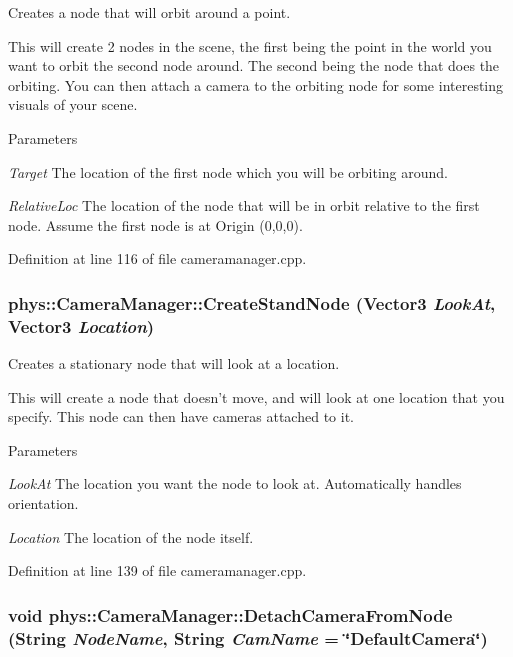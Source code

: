 Creates a node that will orbit around a point. 

This will create 2 nodes in the scene, the first being the point in the world you want to orbit the second node around. The second being the node that does the orbiting. You can then attach a camera to the orbiting node for some interesting visuals of your scene. 
\begin{DoxyParams}{Parameters}
\item[{\em Target}]The location of the first node which you will be orbiting around. \item[{\em RelativeLoc}]The location of the node that will be in orbit relative to the first node. Assume the first node is at Origin (0,0,0). \end{DoxyParams}


Definition at line 116 of file cameramanager.cpp.

\hypertarget{classphys_1_1CameraManager_ab5f9ca6b053670e69f5812cf573d5972}{
\subsubsection[{CreateStandNode}]{ phys::CameraManager::CreateStandNode ({\bf Vector3} {\em LookAt}, \/  {\bf Vector3} {\em Location})}}
\label{d9/d91/classphys_1_1CameraManager_ab5f9ca6b053670e69f5812cf573d5972}


Creates a stationary node that will look at a location. 

This will create a node that doesn't move, and will look at one location that you specify. This node can then have cameras attached to it. 
\begin{DoxyParams}{Parameters}
\item[{\em LookAt}]The location you want the node to look at. Automatically handles orientation. \item[{\em Location}]The location of the node itself. \end{DoxyParams}


Definition at line 139 of file cameramanager.cpp.

\hypertarget{classphys_1_1CameraManager_a5137bdb9dec706fa0fafec665d4f71c8}{
\subsubsection[{DetachCameraFromNode}]{\setlength{\rightskip}{0pt plus 5cm}void phys::CameraManager::DetachCameraFromNode ({\bf String} {\em NodeName}, \/  {\bf String} {\em CamName} = {\ttfamily \char`\"{}DefaultCamera\char`\"{}})}}
\label{d9/d91/classphys_1_1CameraManager_a5137bdb9dec706fa0fafec665d4f71c8}


